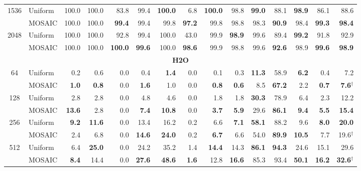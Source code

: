 \begin{table}[tp]
\begin{tabular}{@{} c l rrrrrrrrrrrrr @{}}
    \cmidrule(l){1-15}
    \multirow{2}{*}{1536} & Uniform & 100.0 & 100.0 & 83.8 & 99.4 & \textbf{100.0} & 6.8 & \textbf{100.0} & 98.8 & \textbf{99.0} & 88.1 & \textbf{98.9} & 86.1 & 88.6 \\
     & MOSAIC & 100.0 & 100.0 & \textbf{99.4} & 99.4 & 99.8 & \textbf{97.2} & 99.8 & 98.8 & 98.3 & \textbf{90.9} & 98.4 & \textbf{99.3} & \textbf{98.4} \\
    \cmidrule(l){1-15}
    \multirow{2}{*}{2048} & Uniform & 100.0 & 100.0 & 92.8 & 99.4 & 100.0 & 43.0 & 99.9 & \textbf{98.9} & 99.6 & 89.4 & \textbf{99.2} & 91.8 & 92.9 \\
     & MOSAIC & 100.0 & 100.0 & \textbf{100.0} & \textbf{99.6} & 100.0 & \textbf{98.6} & 99.9 & 98.8 & 99.6 & \textbf{92.6} & 98.9 & \textbf{99.6} & \textbf{98.9} \\
    \midrule
    \multicolumn{15}{c}{\textbf{H2O}} \\
    \midrule
    \multirow{2}{*}{64} & Uniform & 0.2 & 0.6 & 0.0 & 0.4 & \textbf{1.4} & 0.0 & 0.1 & 0.3 & \textbf{11.3} & 58.9 & \textbf{6.2} & 0.4 & 7.2 \\
     & MOSAIC & \textbf{1.0} & \textbf{0.8} & 0.0 & \textbf{1.6} & 1.0 & 0.0 & \textbf{0.8} & \textbf{0.6} & 8.5 & \textbf{67.2} & 2.2 & \textbf{0.7} & \textbf{7.6}$^\dagger$ \\
    \cmidrule(l){1-15}
    \multirow{2}{*}{128} & Uniform & 2.8 & 2.8 & 0.0 & 4.8 & 4.6 & 0.0 & 1.8 & 1.8 & \textbf{30.3} & 78.9 & 6.4 & 2.3 & 12.2 \\
     & MOSAIC & \textbf{13.6} & 2.8 & 0.0 & \textbf{7.4} & \textbf{10.8} & 0.0 & \textbf{3.7} & \textbf{5.9} & 29.6 & \textbf{86.1} & \textbf{9.4} & \textbf{5.5} & \textbf{15.4} \\
    \cmidrule(l){1-15}
    \multirow{2}{*}{256} & Uniform & \textbf{9.2} & \textbf{11.6} & 0.0 & 13.4 & 16.2 & 0.2 & 6.6 & \textbf{7.1} & \textbf{58.1} & 88.2 & 9.6 & \textbf{8.0} & \textbf{20.0} \\
     & MOSAIC & 2.4 & 6.8 & 0.0 & \textbf{14.6} & \textbf{24.0} & 0.2 & \textbf{6.7} & 6.6 & 54.0 & \textbf{89.9} & \textbf{10.5} & 7.7 & 19.6$^\dagger$ \\
    \cmidrule(l){1-15}
    \multirow{2}{*}{512} & Uniform & 6.4 & \textbf{25.0} & 0.0 & 24.2 & 35.2 & 1.4 & \textbf{14.4} & 14.3 & \textbf{86.1} & \textbf{94.3} & 24.6 & 15.1 & 29.6 \\
     & MOSAIC & \textbf{8.4} & 14.4 & 0.0 & \textbf{27.6} & \textbf{48.6} & \textbf{1.6} & 12.8 & \textbf{16.6} & 85.3 & 93.4 & \textbf{50.1} & \textbf{16.2} & \textbf{32.6}$^\dagger$ \\

\end{tabular}
\end{table}
